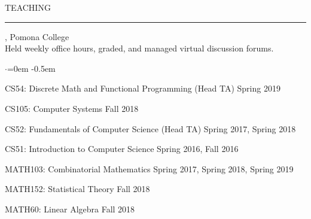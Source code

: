 \documentclass{resume} %
\renewenvironment{rSection}[1]{
\sectionskip
\textcolor{CarnegieMellonRed}{\MakeUppercase{#1}}
\sectionlineskip
\hrule
\begin{list}{}{
\setlength{\leftmargin}{1.5em}
}
\item[]
}{
\end{list}
}
\begin{document}
\begin{rSection}{Teaching}
 , Pomona College\\
Held weekly office hours, graded, and managed virtual discussion forums.
\begin{list}{$\cdot$}{\leftmargin=0em}
    \itemsep -0.5em \vspace{-0.5em}
      \item CS54: Discrete Math and Functional Programming (Head TA) \hfill { Spring 2019}
      \item CS105: Computer Systems \hfill { Fall 2018}
      \item CS52: Fundamentals of Computer Science (Head TA) \hfill { Spring 2017, Spring 2018}
      \item CS51: Introduction to Computer Science \hfill { Spring 2016, Fall 2016}
      \item MATH103: Combinatorial Mathematics \hfill { Spring 2017, Spring 2018, Spring 2019}
      \item MATH152: Statistical Theory \hfill { Fall 2018}
      \item MATH60: Linear Algebra \hfill { Fall 2018}
  \end{list}
\end{rSection}
\newpage
\end{document}
